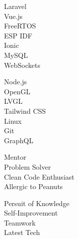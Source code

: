 \documentclass[9pt]{developercv} %
\begin{document}
\begin{minipage}[t]{0.3\textwidth}
	\vspace{-\baselineskip} %


         \begin{minipage}[t]{0.4\textwidth}
        	\vspace{-\baselineskip} %
        	
        	Laravel\\
        	Vue.js\\
                FreeRTOS\\
                ESP IDF\\
                Ionic\\
                MySQL\\
                WebSockets
        \end{minipage}
        \hfill
        \begin{minipage}[t]{0.4\textwidth}
        	\vspace{-\baselineskip} %

        	Node.js\\
        	OpenGL\\
                LVGL\\
        	Tailwind CSS\\
                Linux\\
                Git\\
                GraphQL
        \end{minipage}

\end{minipage}
\hfill
\begin{minipage}[t]{0.2\textwidth}
	\vspace{-\baselineskip} %
	

        Mentor\\
        Problem Solver\\
        Clean Code Enthusiast\\
        Allergic to Peanuts
\end{minipage}
\hfill
\begin{minipage}[t]{0.2\textwidth}
	\vspace{-\baselineskip} %
	

        Persuit of Knowledge\\
        Self-Improvement\\
        Teamwork\\
        Latest Tech
\end{minipage}
\end{document}
